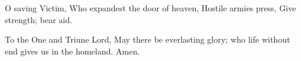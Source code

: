 \begin{otherlanguage}{english} O saving Victim,
Who expandest the door of heaven,
Hostile armies press,
Give strength; bear aid.%

To the One and Triune Lord,
May there be everlasting glory;
who life without end
gives us in the homeland. Amen.\end{otherlanguage}
